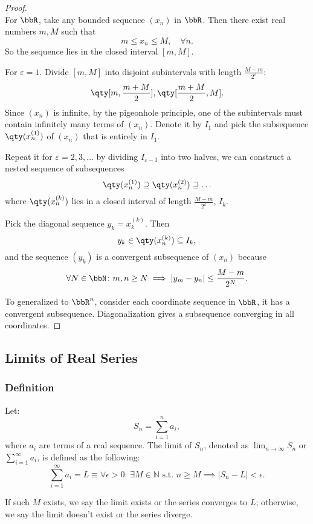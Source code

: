 \documentclass[a4paper,12pt]{report}
\begin{document}
\begin{proof}\mbox{}\\
    For $\bbR$, take any bounded sequence $(x_n)$ in $\bbR$. Then there exist real numbers $m,M$ such that
    \[m\leq x_n\leq M,\quad\forall n.\]
    So the sequence lies in the closed interval $[m,M]$.

    For $\varepsilon=1$. Divide $[m,M]$ into disjoint subintervals with length $\frac{M-m}{2^\varepsilon}$:
    \[\qty[m,\frac{m+M}{2}],\qty[\frac{m+M}{2},M].\]
    Since $(x_n)$ is infinite, by the pigeonhole principle, one of the subintervals must contain infinitely many terms of $(x_n)$. Denote it by $I_1$ and pick the subsequence $\qty(x_n^{(1)})$ of $(x_n)$ that is entirely in $I_1$.

    Repeat it for $\varepsilon=2,3,\ldots$ by dividing $I_{\varepsilon-1}$ into two halves, we can construct a nested sequence of subsequences
    \[\qty(x_n^{(1)})\supseteq \qty(x_n^{(2)})\supseteq\ldots\]
    where $\qty(x_n^{(k)})$ lies in a closed interval of length $\frac{M-m}{2^k}$, $I_k$.

    Pick the diagonal sequence $y_k=x_k^{(k)}$. Then
    \[y_k\in\qty(x_n^{(k)})\subseteq I_k,\]
    and the sequence $(y_k)$ is a convergent subsequence of $(x_n)$ because
    \[\forall N\in\bbN\colon m,n\geq N\implies |y_m-y_n|\leq\frac{M-m}{2^N}.\]

    To generalized to $\bbR^n$, consider each coordinate sequence in $\bbR$, it has a convergent subsequence. Diagonalization gives a subsequence converging in all coordinates.
\end{proof}
\subsection{Limits of Real Series}
\subsubsection{Definition}
Let:
\[S_n = \sum_{i=1}^n a_i,\]
where \(a_i\) are terms of a real sequence. The limit of \(S_n\), denoted as \(\lim_{n\to\infty}S_n\) or \(\sum_{i=1}^{\infty}a_i\), is defined as the following:
\[\sum_{i=1}^{\infty}a_i = L \equiv \forall \epsilon > 0:\, \exists M \in\mathbb{N}\text{\ s.t.\ } n \geq M\implies |S_n - L| < \epsilon.\]

If such $M$ exists, we say the limit exists or the series converges to $L$; otherwise, we say the limit doesn't exist or the series diverge.
\end{document}
